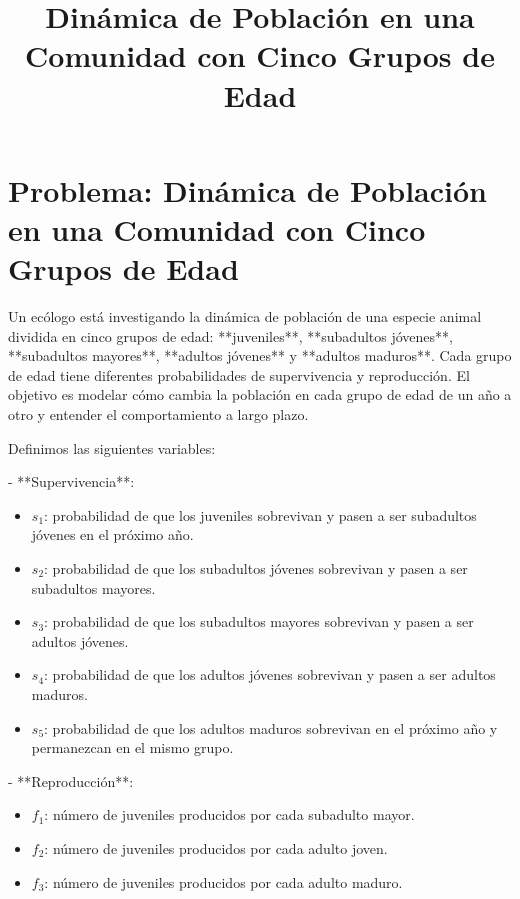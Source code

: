 \documentclass{article}
\begin{document}
\title{Dinámica de Población en una Comunidad con Cinco Grupos de Edad}
\author{}
\date{}
\maketitle

\section*{Problema: Dinámica de Población en una Comunidad con Cinco Grupos de Edad}

Un ecólogo está investigando la dinámica de población de una especie animal dividida en cinco grupos de edad: **juveniles**, **subadultos jóvenes**, **subadultos mayores**, **adultos jóvenes** y **adultos maduros**. Cada grupo de edad tiene diferentes probabilidades de supervivencia y reproducción. El objetivo es modelar cómo cambia la población en cada grupo de edad de un año a otro y entender el comportamiento a largo plazo.

Definimos las siguientes variables:

- **Supervivencia**:
  \begin{itemize}
      \item \( s_1 \): probabilidad de que los juveniles sobrevivan y pasen a ser subadultos jóvenes en el próximo año.
      \item \( s_2 \): probabilidad de que los subadultos jóvenes sobrevivan y pasen a ser subadultos mayores.
      \item \( s_3 \): probabilidad de que los subadultos mayores sobrevivan y pasen a ser adultos jóvenes.
      \item \( s_4 \): probabilidad de que los adultos jóvenes sobrevivan y pasen a ser adultos maduros.
      \item \( s_5 \): probabilidad de que los adultos maduros sobrevivan en el próximo año y permanezcan en el mismo grupo.
  \end{itemize}

- **Reproducción**:
  \begin{itemize}
      \item \( f_1 \): número de juveniles producidos por cada subadulto mayor.
      \item \( f_2 \): número de juveniles producidos por cada adulto joven.
      \item \( f_3 \): número de juveniles producidos por cada adulto maduro.
  \end{itemize}
\end{document}
